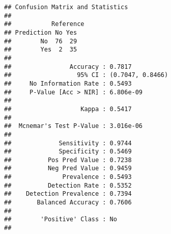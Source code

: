 \documentclass[
]{article}
\begin{document}
\begin{verbatim}
## Confusion Matrix and Statistics
## 
##           Reference
## Prediction No Yes
##        No  76  29
##        Yes  2  35
##                                           
##                Accuracy : 0.7817          
##                  95% CI : (0.7047, 0.8466)
##     No Information Rate : 0.5493          
##     P-Value [Acc > NIR] : 6.806e-09       
##                                           
##                   Kappa : 0.5417          
##                                           
##  Mcnemar's Test P-Value : 3.016e-06       
##                                           
##             Sensitivity : 0.9744          
##             Specificity : 0.5469          
##          Pos Pred Value : 0.7238          
##          Neg Pred Value : 0.9459          
##              Prevalence : 0.5493          
##          Detection Rate : 0.5352          
##    Detection Prevalence : 0.7394          
##       Balanced Accuracy : 0.7606          
##                                           
##        'Positive' Class : No              
## 
\end{verbatim}
\end{document}
